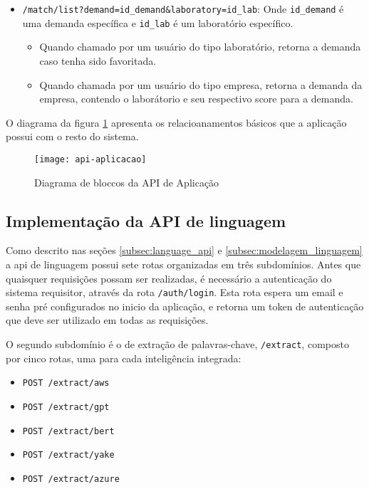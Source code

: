 \begin{itemize}
\begin{itemize}
        \end{itemize}
  \item \texttt{/match/list?demand=id\_demand\&laboratory=id\_lab}: Onde \texttt{id\_demand} é uma demanda específica e \texttt{id\_lab} é um laboratório específico.
        \begin{itemize}
          \item Quando chamado por um usuário do tipo laboratório, retorna a demanda caso tenha sido favoritada.
          \item Quando chamada por um usuário do tipo empresa, retorna a demanda da empresa, contendo o laborátorio e seu respectivo score para a demanda.
        \end{itemize}
\end{itemize}

O diagrama da figura \ref{fig:api_aplicacao} apresenta os relacioanamentos básicos que a aplicação possui com o resto do sistema.

\begin{figure}[htb]
  \caption{Diagrama de bloccos da API de Aplicação}
  \texttt{[image: api-aplicacao]}
  \label{fig:api_aplicacao}
\end{figure}

\subsection{Implementação da API de linguagem}\label{subsec:api-linguagens}

Como descrito nas seções \ref{subsec:language_api} e \ref{subsec:modelagem_linguagem} a \gls{api} de linguagem possui sete rotas organizadas em três subdomínios. Antes que quaisquer requisições possam ser realizadas, é necessário a autenticação do sistema requisitor, através da rota \texttt{/auth/login}. Esta rota espera um email e senha pré configurados no inicio da aplicação, e retorna um token de autenticação que deve ser utilizado em todas as requisições.

O segundo subdomínio é o de extração de palavras-chave, \texttt{/extract}, composto por cinco rotas, uma para cada inteligência integrada:

\begin{itemize}
  \item \texttt{POST /extract/aws}
  \item \texttt{POST /extract/gpt}
  \item \texttt{POST /extract/bert}
  \item \texttt{POST /extract/yake}
  \item \texttt{POST /extract/azure}
\end{itemize}

